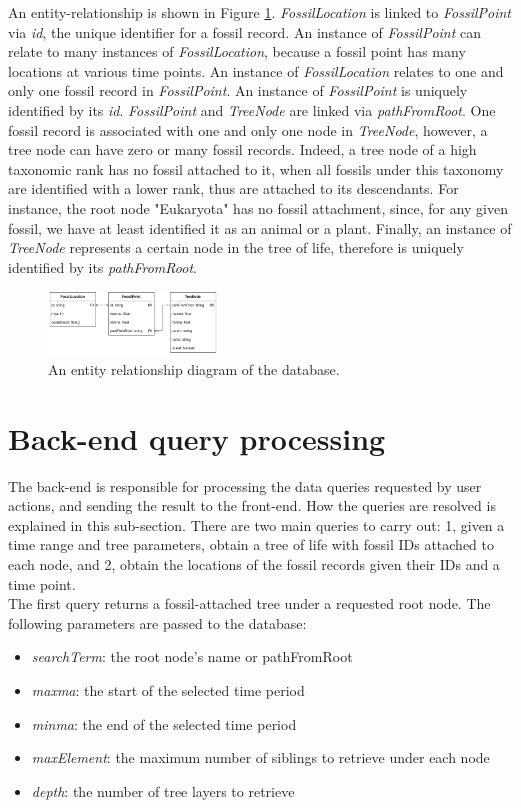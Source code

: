 \documentclass[11pt, a4paper,oneside,chapterprefix=false]{scrbook}
\begin{document}
An entity-relationship is shown in Figure \ref{fig:er}. \emph{FossilLocation} is linked to \emph{FossilPoint} via \emph{id}, the unique identifier for a fossil record. An instance of \emph{FossilPoint} can relate to many instances of \emph{FossilLocation}, because a fossil point has many locations at various time points. An instance of \emph{FossilLocation} relates to one and only one fossil record in \emph{FossilPoint}. An instance of \emph{FossilPoint} is uniquely identified by its \emph{id}. \emph{FossilPoint} and \emph{TreeNode} are linked via \emph{pathFromRoot}. One fossil record is associated with one and only one node in \emph{TreeNode}, however, a tree node can have zero or many fossil records. Indeed, a tree node of a high taxonomic rank has no fossil attached to it, when all fossils under this taxonomy are identified with a lower rank, thus are attached to its descendants. For instance, the root node "Eukaryota" has no fossil attachment, since, for any given fossil, we have at least identified it as an animal or a plant. Finally, an instance of \emph{TreeNode} represents a certain node in the tree of life, therefore is uniquely identified by its \emph{pathFromRoot}.
\begin{figure}[h]
	\centering
	\includegraphics[width=0.4\textwidth]{figures/technical_solution/er}
	\caption{An entity relationship diagram of the database.}
	\label{fig:er}
\end{figure}

\section{Back-end query processing} \label{sec:tec_backend}
The back-end is responsible for processing the data queries requested by user actions, and sending the result to the front-end. How the queries are resolved is explained in this sub-section. There are two main queries to carry out: 1, given a time range and tree parameters, obtain a tree of life with fossil IDs attached to each node, and 2, obtain the locations of the fossil records given their IDs and a time point. \\

The first query returns a fossil-attached tree under a requested root node. The following parameters are passed to the database: 
\begin{itemize}
	\item \textit{searchTerm}: the root node's name or pathFromRoot
	\item \textit{maxma}: the start of the selected time period
	\item \textit{minma}: the end of the selected time period
	\item \textit{maxElement}: the maximum number of siblings to retrieve under each node
	\item \textit{depth}: the number of tree layers to retrieve 
\end{itemize}
\end{document}
